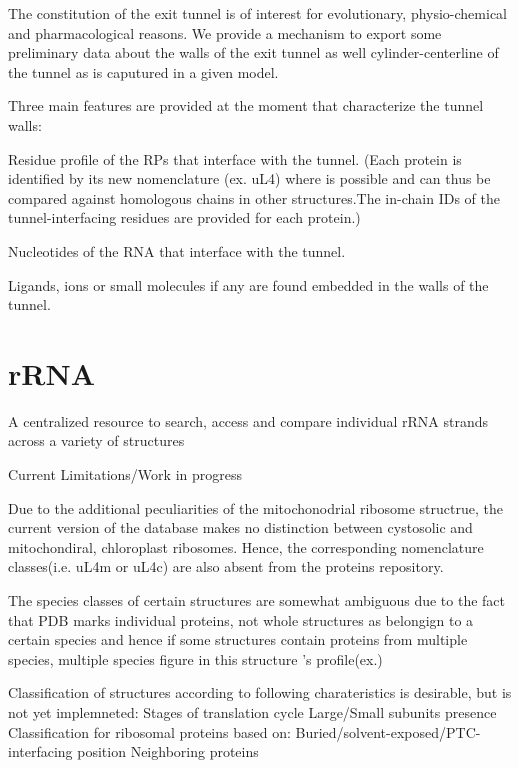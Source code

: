 \documentclass[11pt]{article}
\begin{document}
The constitution of the exit tunnel is of interest for evolutionary, physio-chemical and pharmacological reasons. We provide a mechanism to export some preliminary data about the walls of the exit tunnel as well cylinder-centerline of the tunnel as is caputured in a given model.

Three main features are provided at the moment that characterize the tunnel walls:

    Residue profile of the RPs that interface with the tunnel. (Each protein is identified by its new nomenclature (ex. uL4) where is possible and can thus be compared against homologous chains in other structures.The in-chain IDs of the tunnel-interfacing residues are provided for each protein.)

    Nucleotides of the RNA that interface with the tunnel.

    Ligands, ions or small molecules if any are found embedded in the walls of the tunnel.

\section{rRNA}


A centralized resource to search, access and compare individual rRNA strands across a variety of structures



Current Limitations/Work in progress

Due to the additional peculiarities of the mitochonodrial ribosome structrue, the current version of the database makes no distinction between cystosolic and mitochondiral, chloroplast ribosomes. Hence, the corresponding nomenclature classes(i.e. uL4m or uL4c) are also absent from the proteins repository.

The species classes of certain structures are somewhat ambiguous due to the fact that PDB marks individual proteins, not whole structures as belongign to a certain species and hence if some structures contain proteins from multiple species, multiple species figure in this structure 's profile(ex.)

    Classification of structures according to following charateristics is desirable, but is not yet implemneted:
        Stages of translation cycle
        Large/Small subunits presence
    Classification for ribosomal proteins based on:
        Buried/solvent-exposed/PTC-interfacing position
        Neighboring proteins
\end{document}
